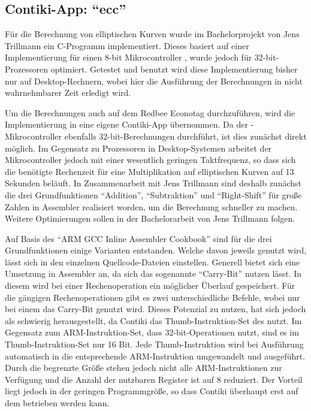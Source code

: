 \subsection{Contiki-App: "`ecc"'}

Für die Berechnung von elliptischen Kurven wurde im Bachelorprojekt  von Jens Trillmann ein C-Programm implementiert.
Dieses basiert auf einer Implementierung für einen 8-bit Mikrocontroller \cite{eccori}, wurde jedoch für 32-bit-Prozessoren optimiert.
Getestet und benutzt wird diese Implementierung bisher nur auf Desktop-Rechnern, wobei hier die Ausführung der Berechnungen in nicht
wahrnehmbarer Zeit erledigt wird.

Um die Berechnungen auch auf dem Redbee Econotag durchzuführen, wird die Implementierung in eine eigene Contiki-App übernommen.
Da der -Mikrocontroller ebenfalls 32-bit-Berechnungen durchführt, ist dies zunächst direkt möglich. Im Gegensatz
zu Prozessoren in Desktop-Systemen arbeitet der Mikrocontroller jedoch mit einer wesentlich geringen Taktfrequenz, so dass sich
die benötigte Rechenzeit für eine Multiplikation auf elliptischen Kurven auf 13 Sekunden beläuft. In Zusammenarbeit mit Jens
Trillmann sind deshalb zunächst die drei Grundfunktionen "`Addition"', "`Subtraktion"' und "`Right-Shift"' für große Zahlen in
Assembler realisiert worden, um die Berechnung schneller zu machen. Weitere Optimierungen sollen in der Bachelorarbeit von Jens
Trillmann folgen.

Auf Basis des "`ARM GCC Inline Assembler Cookbook"' \cite{armasm} sind für die drei Grundfunktionen einige Varianten entstanden.
Welche davon jeweils genutzt wird, lässt sich in den einzelnen Quellcode-Dateien einstellen. Generell bietet sich eine Umsetzung
in Assembler an, da sich das sogenannte "`Carry-Bit"' nutzen lässt. In diesem wird bei einer Rechenoperation ein möglicher Überlauf
gespeichert. Für die gängigen Rechenoperationen gibt es zwei unterschiedliche Befehle, wobei nur bei einem das Carry-Bit genutzt wird.
Dieses Potenzial zu nutzen, hat sich jedoch als schwierig herausgestellt, da Contiki das Thumb-Instruktion-Set des  nutzt.
Im Gegensatz zum ARM-Instruktion-Set, dass 32-bit-Operationen nutzt, sind es im Thumb-Instruktion-Set nur 16 Bit. Jede Thumb-Instruktion
wird bei Ausführung automatisch in die entsprechende ARM-Instruktion umgewandelt und ausgeführt. Durch die begrenzte Größe stehen jedoch
nicht alle ARM-Instruktionen zur Verfügung und die Anzahl der nutzbaren Register ist auf 8 reduziert. Der Vorteil liegt jedoch in der
geringen Programmgröße, so dass Contiki überhaupt erst auf dem  betrieben werden kann.

